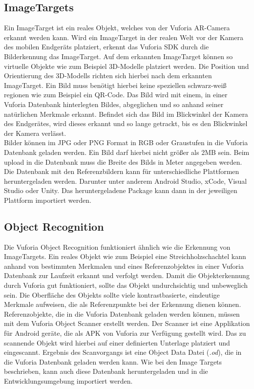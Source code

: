 
\subsection{ImageTargets}
Ein ImageTarget ist ein reales Objekt, welches von der Vuforia AR-Camera erkannt werden kann. Wird ein ImageTarget in der realen Welt vor der Kamera des mobilen Endgeräts platziert, erkennt das Vuforia SDK durch die Bilderkennung das ImageTarget. Auf dem erkannten ImageTarget können so virtuelle Objekte wie zum Beispiel 3D-Modelle platziert werden. Die Position und Orientierung des 3D-Modells richten sich hierbei nach dem erkannten ImageTarget. 
Ein Bild muss benötigt hierbei keine speziellen schwarz-weiß regionen wie zum Beispiel ein QR-Code. Das Bild wird mit einem, in einer Vuforia Datenbank hinterlegten Bildes, abgeglichen und so anhand seiner natürlichen Merkmale erkannt. Befindet sich das Bild im Blickwinkel der Kamera des Endgerätes, wird dieses erkannt und so lange getrackt, bis es den Blickwinkel der Kamera verlässt.\\
Bilder können im JPG oder PNG Format in RGB oder Graustufen in die Vuforia Datenbank geladen werden. Ein Bild darf hierbei nicht größer als 2MB sein. Beim upload in die Datenbank muss die Breite des Bilds in Meter angegeben werden. Die Datenbank mit den Referenzbildern kann für unterschiedliche Plattformen heruntergeladen werden. Darunter unter anderem Android Studio, xCode, Visual Studio oder Unity. Das heruntergeladene Package kann dann in der jeweiligen Plattform importiert werden.


\subsection{Object Recognition}
Die Vuforia Object Recognition funktioniert ähnlich wie die Erkennung von ImageTargets. Ein reales Objekt wie zum Beispiel eine Streichholzschachtel kann anhand von bestimmten Merkmalen und eines Referenzobjektes in einer Vuforia Datenbank zur Laufzeit erkannt und verfolgt werden. Damit die Objekterkennung durch Vuforia gut funktioniert, sollte das Objekt undurchsichtig und unbeweglich sein. Die Oberfläche des Objekts sollte viele kontrastbasierte, eindeutige Merkmale aufweisen, die als Referenzpunkte bei der Erkennung dienen können.\\
Referenzobjekte, die in die Vuforia Datenbank geladen werden können, müssen mit dem Vuforia Object Scanner  erstellt werden. Der Scanner ist eine Applikation für Android geräte, die als APK von Vuforia zur Verfügung gestellt wird. Das zu scannende Objekt wird hierbei auf einer definierten Unterlage platziert und eingescannt. Ergebnis des Scanvorgangs ist eine Object Data Datei (\textit{.od}), die in die Vuforia Datenbank geladen werden kann. Wie bei den Image Targets beschrieben, kann auch diese Datenbank heruntergeladen und in die Entwicklungsumgebung importiert werden.
